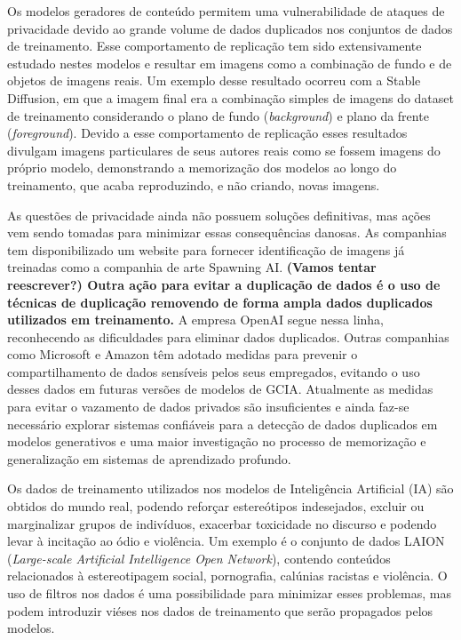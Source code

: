 Os modelos geradores de conteúdo permitem uma vulnerabilidade de ataques de privacidade devido ao grande volume de dados duplicados nos conjuntos de dados de treinamento. 
Esse comportamento de replicação tem sido extensivamente estudado nestes modelos e resultar em imagens 
como a combinação de fundo e de objetos de imagens reais. Um exemplo desse resultado 
ocorreu com a Stable Diffusion, em que a imagem  final era a combinação simples de imagens do dataset de treinamento 
considerando o plano de fundo (\textit{background}) e plano da frente (\textit{foreground}). Devido a esse comportamento de replicação  
esses resultados divulgam imagens particulares de seus autores reais como se fossem 
imagens do próprio modelo, demonstrando a memorização dos modelos ao longo
do treinamento, que acaba reproduzindo, e não criando, novas imagens.

As questões de privacidade ainda não possuem soluções definitivas, mas ações vem sendo tomadas para minimizar essas consequências 
danosas. As companhias tem disponibilizado um website para fornecer identificação de imagens já treinadas como a 
companhia de arte Spawning AI. 
\textbf{(Vamos tentar reescrever?) Outra ação para evitar a duplicação de dados é o uso de técnicas de duplicação removendo de forma ampla dados
duplicados utilizados em treinamento.} A empresa OpenAI segue nessa linha, reconhecendo as dificuldades para eliminar dados duplicados. 
Outras companhias como Microsoft e Amazon têm adotado medidas para prevenir o compartilhamento de dados sensíveis pelos seus empregados, 
evitando o uso desses dados em futuras versões de modelos de GCIA.
Atualmente as medidas para evitar o vazamento de dados privados são insuficientes e 
ainda faz-se necessário explorar sistemas confiáveis para a detecção de dados duplicados em modelos generativos e uma 
maior investigação no processo de memorização e generalização em sistemas de aprendizado profundo.

Os dados de treinamento utilizados nos modelos de Inteligência Artificial (IA) são obtidos do mundo real, podendo reforçar estereótipos indesejados, excluir ou marginalizar grupos de indivíduos, exacerbar toxicidade no discurso e podendo levar à incitação ao ódio e violência.
Um exemplo é o conjunto de dados LAION (\textit{Large-scale Artificial Intelligence Open Network}), contendo conteúdos relacionados à estereotipagem social,
pornografia, calúnias racistas e violência. O uso de filtros nos dados é uma possibilidade para minimizar esses problemas, mas podem introduzir viéses nos dados de treinamento que serão propagados pelos modelos.

